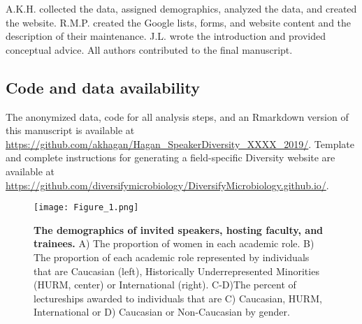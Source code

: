 \documentclass[10pt,]{article}
\begin{document}
A.K.H. collected the data, assigned demographics, analyzed the data, and
created the website. R.M.P. created the Google lists, forms, and website
content and the description of their maintenance. J.L. wrote the
introduction and provided conceptual advice. All authors contributed to
the final manuscript.

\subsection{Code and data
availability}\label{code-and-data-availability}

The anonymized data, code for all analysis steps, and an Rmarkdown
version of this manuscript is available at
\url{https://github.com/akhagan/Hagan_SpeakerDiversity_XXXX_2019/}.
Template and complete instructions for generating a field-specific
Diversity website are available at
\url{https://github.com/diversifymicrobiology/DiversifyMicrobiology.github.io/}.

\begin{figure}
\centering
\texttt{[image: Figure\_1.png]}
\caption{\textbf{The demographics of invited speakers, hosting faculty,
and trainees.} A) The proportion of women in each academic role. B) The
proportion of each academic role represented by individuals that are
Caucasian (left), Historically Underrepresented Minorities (HURM,
center) or International (right). C-D)The percent of lectureships
awarded to individuals that are C) Caucasian, HURM, International or D)
Caucasian or Non-Caucasian by gender.}
\end{figure}

\newpage
\end{document}
